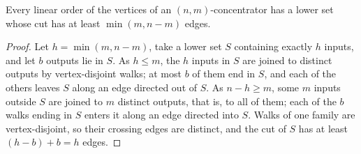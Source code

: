 \begin{lemma}
  \label{lem:lowerbounds-algebraic-concentrator-cut}
  \leanok
  Every linear order of the vertices of an $(n,m)$-concentrator has a lower set whose cut has
  at least $\min(m,n-m)$ edges.
\end{lemma}
\begin{proof}
  \leanok
  Let $h=\min(m,n-m)$, take a lower set $S$ containing exactly $h$ inputs, and let $b$ outputs
  lie in $S$. As $h\le m$, the $h$ inputs in $S$ are joined to distinct outputs by
  vertex-disjoint walks; at most $b$ of them end in $S$, and each of the others leaves $S$ along
  an edge directed out of $S$. As $n-h\ge m$, some $m$ inputs outside $S$ are joined to $m$
  distinct outputs, that is, to all of them; each of the $b$ walks ending in $S$ enters it along
  an edge directed into $S$. Walks of one family are vertex-disjoint, so their crossing edges are
  distinct, and the cut of $S$ has at least $(h-b)+b=h$ edges.
\end{proof}

